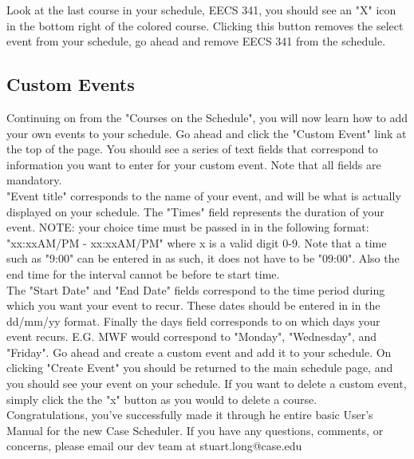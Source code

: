 \documentclass[pdftex,12pt,letter]{article}
\begin{document}
Look at the last course in your schedule, EECS 341, you should see an "X" icon in the bottom right of the colored course. Clicking this button removes the select event from your schedule, go ahead and remove EECS 341 from the schedule.

\subsection{Custom Events}
Continuing on from the "Courses on the Schedule", you will now learn how to add your own events to your schedule. Go ahead and click the "Custom Event" link at the top of the page. You should see a series of text fields that correspond to information you want to enter for your custom event. Note that all fields are mandatory.\\

"Event title" corresponds to the name of your event, and will be what is actually displayed on your schedule. The "Times" field represents the duration of your event. NOTE: your choice time must be passed in in the following format: "xx:xxAM/PM - xx:xxAM/PM" where x is a valid digit 0-9. Note that a time such as "9:00" can be entered in as such, it does not have to be "09:00". Also the end time for the interval cannot be before te start time.\\

The "Start Date" and "End Date" fields correspond to the time period during which you want your event to recur. These dates should be entered in in the dd/mm/yy format. Finally the days field corresponds to on which days your event recurs. E.G. MWF would correspond to "Monday", "Wednesday", and "Friday". Go ahead and create a custom event and add it to your schedule. On clicking "Create Event" you should be returned to the main schedule page, and you should see your event on your schedule. If you want to delete a custom event, simply click the the "x" button as you would to delete a course.\\

Congratulations, you've successfully made it through he entire basic User's Manual for the new Case Scheduler. If you have any questions, comments, or concerns, please email our dev team at stuart.long@case.edu
\end{document}
